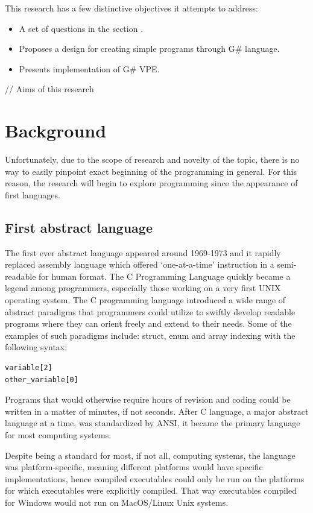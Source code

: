\documentclass{article}
\begin{document}
This research has a few distinctive objectives it attempts to address:
\begin{itemize}
    \item A set of questions in the section .
    \item Proposes a design for creating simple programs through G\# language.
    \item Presents implementation of G\# VPE.
\end{itemize}

// Aims of this research




\section{Background}
Unfortunately, due to the scope of research and novelty of the topic, there is no way to easily pinpoint exact beginning of the programming in general. For this reason, the research will begin to explore programming since the appearance of first languages.

\subsection{First abstract language}
The first ever abstract language appeared around 1969-1973 and it rapidly replaced assembly language which offered ‘one-at-a-time’ instruction in a semi-readable for human format. The C Programming Language quickly became a legend among programmers, especially those working on a very first UNIX operating system\citep{ritche_clang}.
The C programming language introduced a wide range of abstract paradigms that programmers could utilize to swiftly develop readable programs where they can orient freely and extend to their needs. Some of the examples of such paradigms include: struct, enum and array indexing with the following syntax:

\begin{lstlisting}[caption=C array indexing]
variable[2]
other_variable[0]
\end{lstlisting}

Programs that would otherwise require hours of revision and coding could be written in a matter of minutes, if not seconds. After C language, a major abstract language at a time, was standardized by ANSI, it became the primary language for most computing systems.  

Despite being a standard for most, if not all, computing systems, the language was platform-specific, meaning different platforms would have specific implementations, hence compiled executables could only be run on the platforms for which executables were explicitly compiled. That way executables compiled for Windows would not run on MacOS/Linux Unix systems.
\end{document}
